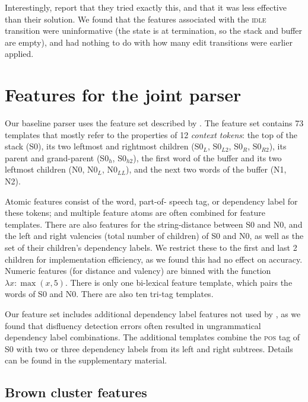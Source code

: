 \documentclass[11pt,letterpaper]{article}
\newcommand{\pos}{\textsc{pos}\xspace}
\newcommand{\szero}{S0\xspace}
\newcommand{\nzero}{N0\xspace}
\newcommand{\szeroH}{S0$_h$\xspace}
\newcommand{\szeroHH}{S0$_{h2}$\xspace}
\newcommand{\szeroL}{S0$_L$\xspace}
\newcommand{\szeroLL}{S0$_{L2}$\xspace}
\newcommand{\szeroR}{S0$_R$\xspace}
\newcommand{\szeroRR}{S0$_{R2}$\xspace}
\newcommand{\nzeroL}{N0$_L$\xspace}
\newcommand{\nzeroLL}{N0$_{LL}$\xspace}
\begin{document}
Interestingly, \citet{zhang:13} report that they tried exactly this, and that it
was less effective than their solution. We found that the features
associated with the \textsc{idle} transition were uninformative (the state is at
termination, so the stack and buffer are empty), and had nothing to do with how
many edit transitions were earlier applied.

\section{Features for the joint parser}
\label{sec:features}

Our baseline parser uses the feature set described by \citet{zhang:11}.
The feature set contains 73 templates that mostly refer to the properties of
12 \emph{context tokens}: the top of the stack (\szero), its two leftmost and
rightmost children (\szeroL, \szeroLL, \szeroR, \szeroRR), its parent and
grand-parent (\szeroH, \szeroHH), the first word of the buffer and its two leftmost
children (\nzero, \nzeroL, \nzeroLL), and the next two words of the buffer (N1, N2).

Atomic features consist of the word, part-of- speech tag, or dependency label
for these tokens; and multiple feature atoms are often combined for feature
templates. There are also features for the string-distance between \szero
and \nzero, and the left and right valencies
(total number of children) of \szero and \nzero, as well as the set of their children's
dependency labels. We restrict these
to the first and last 2 children for implementation efficiency, as we found this
had no effect on accuracy. Numeric features (for distance and valency) are binned
with the function $\lambda x: \max(x, 5)$.
There is only one bi-lexical feature template, which pairs
the words of \szero and \nzero.
There are also ten tri-tag templates.

Our feature set includes additional dependency label features not used by \citet{zhang:11},
as we found that disfluency detection errors often resulted in ungrammatical
dependency label combinations.  The additional templates combine the \pos tag of \szero with
two or three dependency labels from its left and right subtrees.  Details can be found in
the supplementary material.

\subsection{Brown cluster features}
\label{sec:browns}
\end{document}
